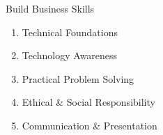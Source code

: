 \begin{frame}{ Build Business Skills}
    \begin{enumerate}
        \item Technical Foundations
        \item Technology Awareness
        \item Practical Problem Solving
        \item Ethical \& Social Responsibility
        \item Communication \& Presentation
    \end{enumerate}
\end{frame}


